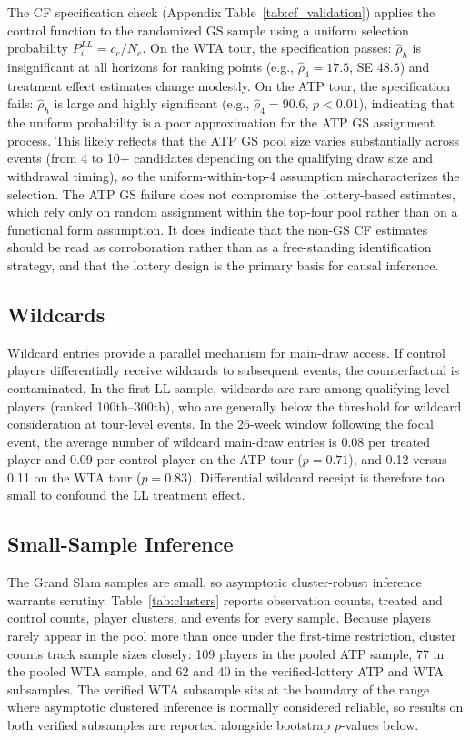 The CF specification check (Appendix Table~\ref{tab:cf_validation}) applies the control function to the randomized GS sample using a uniform selection probability $P_i^{LL} = c_e / N_e$. On the WTA tour, the specification passes: $\hat{\rho}_h$ is insignificant at all horizons for ranking points (e.g., $\hat{\rho}_4 = 17.5$, SE $48.5$) and treatment effect estimates change modestly. On the ATP tour, the specification fails: $\hat{\rho}_h$ is large and highly significant (e.g., $\hat{\rho}_4 = 90.6$, $p < 0.01$), indicating that the uniform probability is a poor approximation for the ATP GS assignment process. This likely reflects that the ATP GS pool size varies substantially across events (from 4 to 10+ candidates depending on the qualifying draw size and withdrawal timing), so the uniform-within-top-4 assumption mischaracterizes the selection. The ATP GS failure does not compromise the lottery-based estimates, which rely only on random assignment within the top-four pool rather than on a functional form assumption. It does indicate that the non-GS CF estimates should be read as corroboration rather than as a free-standing identification strategy, and that the lottery design is the primary basis for causal inference.

\subsection{Wildcards}
\label{sec:robustness_wildcards}

Wildcard entries provide a parallel mechanism for main-draw access. If control players differentially receive wildcards to subsequent events, the counterfactual is contaminated. In the first-LL sample, wildcards are rare among qualifying-level players (ranked 100th--300th), who are generally below the threshold for wildcard consideration at tour-level events. In the 26-week window following the focal event, the average number of wildcard main-draw entries is 0.08 per treated player and 0.09 per control player on the ATP tour ($p = 0.71$), and 0.12 versus 0.11 on the WTA tour ($p = 0.83$). Differential wildcard receipt is therefore too small to confound the LL treatment effect.

\subsection{Small-Sample Inference}
\label{sec:robustness_power}

The Grand Slam samples are small, so asymptotic cluster-robust inference warrants scrutiny. Table~\ref{tab:clusters} reports observation counts, treated and control counts, player clusters, and events for every sample. Because players rarely appear in the pool more than once under the first-time restriction, cluster counts track sample sizes closely: 109 players in the pooled ATP sample, 77 in the pooled WTA sample, and 62 and 40 in the verified-lottery ATP and WTA subsamples. The verified WTA subsample sits at the boundary of the range where asymptotic clustered inference is normally considered reliable, so results on both verified subsamples are reported alongside bootstrap $p$-values below.

